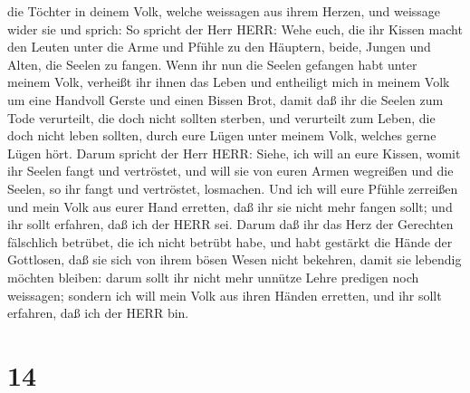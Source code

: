 die Töchter in deinem Volk, welche weissagen aus ihrem Herzen, und
weissage wider sie  und sprich: So spricht der Herr HERR:
Wehe euch, die ihr Kissen macht den Leuten unter die Arme und Pfühle zu
den Häuptern, beide, Jungen und Alten, die Seelen zu fangen. Wenn ihr
nun die Seelen gefangen habt unter meinem Volk, verheißt ihr ihnen das
Leben  und entheiligt mich in meinem Volk um eine Handvoll
Gerste und einen Bissen Brot, damit daß ihr die Seelen zum Tode
verurteilt, die doch nicht sollten sterben, und verurteilt zum Leben,
die doch nicht leben sollten, durch eure Lügen unter meinem Volk,
welches gerne Lügen hört.  Darum spricht der Herr HERR:
Siehe, ich will an eure Kissen, womit ihr Seelen fangt und vertröstet,
und will sie von euren Armen wegreißen und die Seelen, so ihr fangt und
vertröstet, losmachen.  Und ich will eure Pfühle zerreißen
und mein Volk aus eurer Hand erretten, daß ihr sie nicht mehr fangen
sollt; und ihr sollt erfahren, daß ich der HERR sei.  Darum
daß ihr das Herz der Gerechten fälschlich betrübet, die ich nicht
betrübt habe, und habt gestärkt die Hände der Gottlosen, daß sie sich
von ihrem bösen Wesen nicht bekehren, damit sie lebendig möchten
bleiben:  darum sollt ihr nicht mehr unnütze Lehre predigen
noch weissagen; sondern ich will mein Volk aus ihren Händen erretten,
und ihr sollt erfahren, daß ich der HERR bin.

\hypertarget{section-13}{%
\section{14}\label{section-13}}

